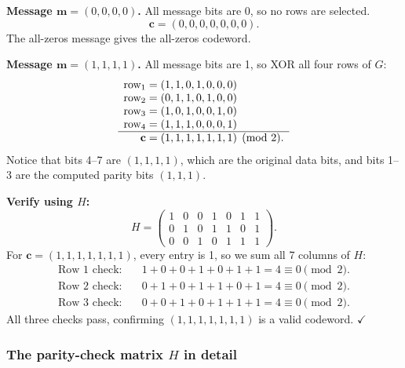 \documentclass[11pt, a4paper]{article}
\theoremstyle{definition}
\theoremstyle{plain}
\theoremstyle{remark}
\begin{document}
\begin{workedexample}[Encoding $\mathbf{m}=(0,0,0,0)$ and
$\mathbf{m}=(1,1,1,1)$]

\textbf{Message $\mathbf{m} = (0,0,0,0)$.}
All message bits are 0, so no rows are selected.
\[
  \mathbf{c} = (0,0,0,0,0,0,0).
\]
The all-zeros message gives the all-zeros codeword.

\medskip\noindent
\textbf{Message $\mathbf{m} = (1,1,1,1)$.}
All message bits are 1, so XOR all four rows of $G$:
\[
  \begin{array}{r@{\;}l}
    \text{row}_1 &= (1,1,0,1,0,0,0)\\
    \text{row}_2 &= (0,1,1,0,1,0,0)\\
    \text{row}_3 &= (1,0,1,0,0,1,0)\\
    \text{row}_4 &= (1,1,1,0,0,0,1)\\
    \hline
    \mathbf{c}   &= (1,1,1,1,1,1,1) \pmod{2}.
  \end{array}
\]
Notice that bits 4--7 are $(1,1,1,1)$, which are the original data
bits, and bits 1--3 are the computed parity bits $(1,1,1)$.

\medskip\noindent
\textbf{Verify using $H$:}
\[
  H = \begin{pmatrix}
    1 & 0 & 0 & 1 & 0 & 1 & 1 \\
    0 & 1 & 0 & 1 & 1 & 0 & 1 \\
    0 & 0 & 1 & 0 & 1 & 1 & 1
  \end{pmatrix}.
\]
For $\mathbf{c} = (1,1,1,1,1,1,1)$, every entry is 1, so we sum all
7 columns of $H$:
\begin{align*}
  \text{Row 1 check:}&\quad 1+0+0+1+0+1+1 = 4 \equiv 0 \pmod{2}.\\
  \text{Row 2 check:}&\quad 0+1+0+1+1+0+1 = 4 \equiv 0 \pmod{2}.\\
  \text{Row 3 check:}&\quad 0+0+1+0+1+1+1 = 4 \equiv 0 \pmod{2}.
\end{align*}
All three checks pass, confirming $(1,1,1,1,1,1,1)$ is a valid
codeword. $\checkmark$

\end{workedexample}

\subsubsection{The parity-check matrix $H$ in detail}
\end{document}

